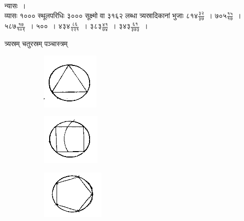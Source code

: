 \documentclass[11pt, openany]{book}
\begin{document}
न्यासः~। \\

\vspace{-4mm}
व्यासः १००० स्थूलपरिधिः ३००० सूक्ष्मो वा ३१६२ लब्धा 
त्र्यस्रादिकानां भुजाः $\mbox{८१४}\frac{\mbox{३२}}{\mbox{३७}}$~। $\mbox{७०५}\frac{\mbox{१५}}{\mbox{१७}}$~। $\mbox{५८७}\frac{\mbox{१७}}{\mbox{१०९}}$~। ५००~। $\mbox{४३४}\frac{\mbox{८६}}{\mbox{२२१}}$~। $\mbox{३८३}\frac{\mbox{४१}}{\mbox{७४}}$~। $\mbox{३४३}\frac{\mbox{६१}}{\mbox{३७३}}$~। 
\vspace{2mm}

\begin{center}
त्र्यस्रम् \hspace{28mm} चतुरस्रम् \hspace{28mm} पञ्चास्त्रम्
\end{center}
\vspace{-8mm}

\begin{figure}[h!]
     \centering
     \begin{subfigure}[b]{0.3\textwidth}
         \centering
          \captionsetup{labelformat=empty}
         \includegraphics[scale=0.85]{graphics/capture83'.png}
     \end{subfigure}
     \hfill
     \begin{subfigure}[b]{0.3\textwidth}
         \centering
        \captionsetup{labelformat=empty}
         \includegraphics[scale=0.85]{graphics/capture83''.png}
     \end{subfigure}
     \hfill
     \begin{subfigure}[b]{0.3\textwidth}
         \centering
       \captionsetup{labelformat=empty}
         \includegraphics[scale=0.85]{graphics/capture83'''.png}
     \end{subfigure}
\end{figure}
 \vspace{-4mm}
\end{document}
